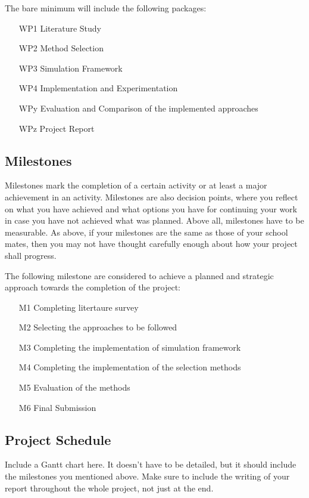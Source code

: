 \documentclass[rnd]{mas_proposal}
\begin{document}
The bare minimum will include the following packages:
\begin{enumerate}
    \item[WP1] Literature Study
    \item[WP2] Method Selection
    \item[WP3] Simulation Framework
    \item[WP4] Implementation and Experimentation
    \item[WPy] Evaluation and Comparison of the implemented approaches
    \item[WPz] Project Report
\end{enumerate}

\subsection{Milestones}
Milestones mark the completion of a certain activity or at least a major achievement in an activity. Milestones are also decision points, where you reflect on what you have achieved and what options you have for continuing your work in case you have not achieved what was planned. Above all, milestones have to be measurable. As above, if your milestones are the same as those of your school mates, then you may not have thought carefully enough about how your project shall progress.

The following milestone are considered to achieve a planned and strategic approach towards the completion of the project:
\begin{enumerate}
    \item[M1] Completing litertaure survey
    \item[M2] Selecting the approaches to be followed
    \item[M3] Completing the implementation of simulation framework
    \item[M4] Completing the implementation of the selection methods
    \item[M5] Evaluation of the methods
    \item[M6] Final Submission
\end{enumerate}

\subsection{Project Schedule}
Include a Gantt chart here. It doesn't have to be detailed, but it should include the milestones you mentioned above.
Make sure to include the writing of your report throughout the whole project, not just at the end.
\end{document}
